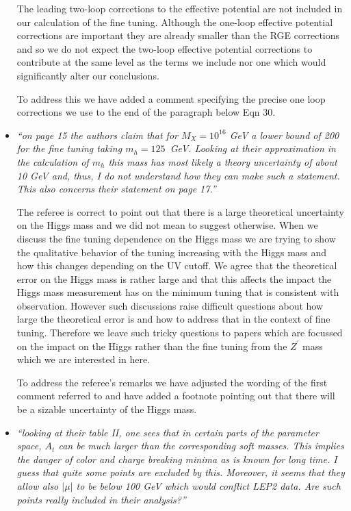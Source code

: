 \documentclass[12pt]{article}
\begin{document}
\begin{itemize}
The leading two-loop corrcetions to the effective potential are not
included in our calculation of the fine tuning.  Although the one-loop
effective potential corrections are important they are already smaller
than the RGE corrections and so we do not expect the two-loop
effective potential corrections to contribute at the same level as
the terms we include nor one which would significantly alter our
conclusions.

To address this we have added a comment specifying the precise one
loop corrections we use to the end of the paragraph below Eqn 30.

\item {\it ``on page 15 the authors claim that for $M_X = 10^{16}$ GeV a
lower bound of 200 for the fine tuning taking $m_h = 125$~GeV. Looking
at their approximation in the calculation of $m_h$ this mass has most
likely a theory uncertainty of about 10 GeV and, thus, I do not
understand how they can make such a statement.  This also concerns
their statement on page 17.''}

The referee is correct to point out that there is a large theoretical
uncertainty on the Higgs mass and we did not mean to suggest
otherwise.  When we discuss the fine tuning dependence on the Higgs
mass we are trying to show the qualitative behavior of the tuning
increasing with the Higgs mass and how this changes depending on the
UV cutoff.  We agree that the theoretical error on the Higgs mass is
rather large and that this affects the impact the Higgs mass
measurement has on the minimum tuning that is consistent with
observation.  However such discussions raise difficult questions about
how large the theoretical error is and how to address that in the context
of fine tuning.  Therefore we leave such tricky questions to papers
which are focussed on the impact on the Higgs rather than the fine
tuning from the $Z^\prime$ mass which we are interested in here.

To address the referee's remarks we have adjusted the wording of the
first comment referred to and have added a footnote pointing out that
there will be a sizable uncertainty of the Higgs mass.

\item {\it ``looking at their table II, one sees that in certain parts of
the parameter space, $A_t$ can be much larger than the corresponding soft
masses. This implies the danger of color and charge breaking minima as is
known for long time. I guess that quite some points are excluded by this.
Moreover, it seems that they allow also $|\mu|$ to be below 100 GeV which
would conflict LEP2 data. Are such points really included in their analysis?''}


\end{itemize}
\end{document}
